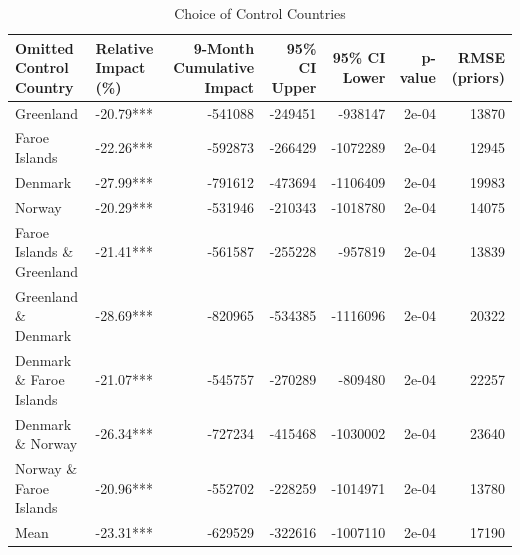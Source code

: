 \begin{table}

\caption{Choice of Control Countries}
\centering
\begin{tabular}[t]{l|l|r|r|r|r|r}
\hline
Omitted Control Country & Relative Impact (\%) & 9-Month Cumulative Impact & 95\% CI Upper & 95\% CI Lower & p-value & RMSE (priors)\\
\hline
Greenland & -20.79*** & -541088 & -249451 & -938147 & 2e-04 & 13870\\
\hline
Faroe Islands & -22.26*** & -592873 & -266429 & -1072289 & 2e-04 & 12945\\
\hline
Denmark & -27.99*** & -791612 & -473694 & -1106409 & 2e-04 & 19983\\
\hline
Norway & -20.29*** & -531946 & -210343 & -1018780 & 2e-04 & 14075\\
\hline
Faroe Islands \& Greenland & -21.41*** & -561587 & -255228 & -957819 & 2e-04 & 13839\\
\hline
Greenland \& Denmark & -28.69*** & -820965 & -534385 & -1116096 & 2e-04 & 20322\\
\hline
Denmark \& Faroe Islands & -21.07*** & -545757 & -270289 & -809480 & 2e-04 & 22257\\
\hline
Denmark \& Norway & -26.34*** & -727234 & -415468 & -1030002 & 2e-04 & 23640\\
\hline
Norway \& Faroe Islands & -20.96*** & -552702 & -228259 & -1014971 & 2e-04 & 13780\\
\hline
Mean & -23.31*** & -629529 & -322616 & -1007110 & 2e-04 & 17190\\
\hline
\end{tabular}
\end{table}
